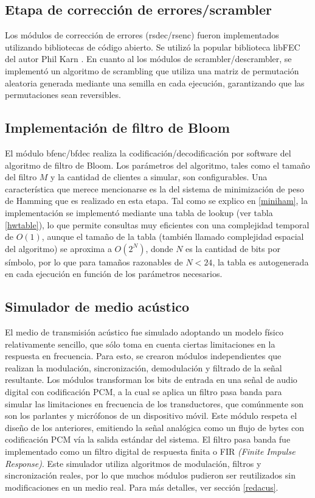 \subsection{Etapa de corrección de errores/scrambler}

Los módulos de corrección de errores (rsdec/rsenc) fueron implementados utilizando bibliotecas de código abierto. Se utilizó la popular biblioteca libFEC del autor Phil Karn \cite{libfec}. En cuanto al los módulos de scrambler/descrambler, se implementó un algoritmo de scrambling que utiliza una matriz de permutación aleatoria generada mediante una semilla en cada ejecución, garantizando que las permutaciones sean reversibles.

\subsection{Implementación de filtro de Bloom}
El módulo bfenc/bfdec realiza la codificación/decodificación por software del algoritmo de filtro de Bloom. Los parámetros del algoritmo, tales como el tamaño del filtro $M$ y la cantidad de clientes a simular, son configurables. Una característica que merece mencionarse es la del sistema de minimización de peso de Hamming que es realizado en esta etapa. Tal como se explico en \ref{miniham}, la  implementación se implementó mediante una tabla de lookup (ver tabla \ref{hwtable}), lo que permite consultas muy eficientes con una complejidad temporal de $O(1)$, aunque el tamaño de la tabla (también llamado complejidad espacial del algoritmo) se aproxima a $O(2^{N})$, donde $N$ es la cantidad de bits por símbolo, por lo que para tamaños razonables de $N<24$, la tabla es autogenerada en cada ejecución en función de los parámetros necesarios.

\subsection{Simulador de medio acústico}

El medio de transmisión acústico fue simulado adoptando un modelo físico relativamente sencillo, que sólo toma en cuenta ciertas limitaciones en la respuesta en frecuencia. Para esto, se crearon módulos independientes que realizan la modulación, sincronización, demodulación y filtrado de la señal resultante.
Los módulos transforman los bits de entrada en una señal de audio digital con codificación PCM, a la cual se aplica un filtro pasa banda para simular las limitaciones en frecuencia de los transductores, que comúnmente son son los parlantes y micrófonos de un dispositivo móvil. Este módulo respeta el diseño de los anteriores, emitiendo la señal analógica como un flujo de bytes con codificación PCM vía la salida estándar del sistema. El filtro pasa banda fue implementado como un filtro digital de respuesta finita o FIR \textit{(Finite Impulse Response)}.
Este simulador utiliza algoritmos de modulación, filtros y sincronización reales, por lo que muchos módulos pudieron ser reutilizados sin modificaciones en un medio real. Para más detalles, ver sección \ref{redacus}.

